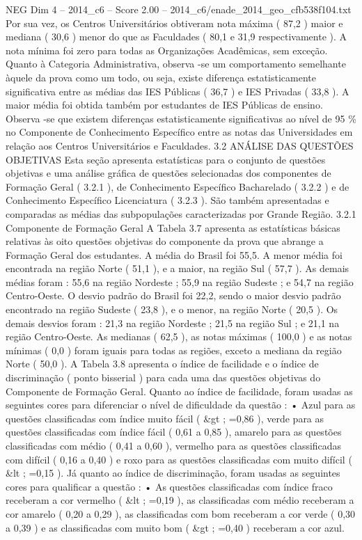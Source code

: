 \begin{textsample}{NEG Dim 4 – 2014\_c6 – Score 2.00 – 2014\_c6/enade\_2014\_geo\_cfb538f104.txt}
Por sua vez, os Centros Universitários obtiveram nota máxima ( 87,2 ) maior e mediana ( 30,6 ) menor do que as Faculdades ( 80,1 e 31,9 respectivamente ).
A nota mínima foi zero para todas as Organizações Acadêmicas, sem exceção.
Quanto à Categoria Administrativa, observa -se um comportamento semelhante àquele da prova como um todo, ou seja, existe diferença estatisticamente significativa entre as médias das IES Públicas ( 36,7 ) e IES Privadas ( 33,8 ).
A maior média foi obtida também por estudantes de IES Públicas de ensino.
Observa -se que existem diferenças estatisticamente significativas ao nível de 95 \% no Componente de Conhecimento Específico entre as notas das Universidades em relação aos Centros Universitários e Faculdades. 3.2 ANÁLISE DAS QUESTÕES OBJETIVAS Esta seção apresenta estatísticas para o conjunto de questões objetivas e uma análise gráfica de questões selecionadas dos componentes de Formação Geral ( 3.2.1 ), de Conhecimento Específico Bacharelado ( 3.2.2 ) e de Conhecimento Específico Licenciatura ( 3.2.3 ).
São também apresentadas e comparadas as médias das subpopulações caracterizadas por Grande Região. 3.2.1 Componente de Formação Geral A Tabela 3.7 apresenta as estatísticas básicas relativas às oito questões objetivas do componente da prova que abrange a Formação Geral dos estudantes.
A média do Brasil foi 55,5.
A menor média foi encontrada na região Norte ( 51,1 ), e a maior, na região Sul ( 57,7 ).
As demais médias foram : 55,6 na região Nordeste ; 55,9 na região Sudeste ; e 54,7 na região Centro-Oeste.
O desvio padrão do Brasil foi 22,2, sendo o maior desvio padrão encontrado na região Sudeste ( 23,8 ), e o menor, na região Norte ( 20,5 ).
Os demais desvios foram : 21,3 na região Nordeste ; 21,5 na região Sul ; e 21,1 na região Centro-Oeste.
As medianas ( 62,5 ), as notas máximas ( 100,0 ) e as notas mínimas ( 0,0 ) foram iguais para todas as regiões, exceto a mediana da região Norte ( 50,0 ).
A Tabela 3.8 apresenta o índice de facilidade e o índice de discriminação ( ponto bisserial ) para cada uma das questões objetivas do Componente de Formação Geral.
Quanto ao índice de facilidade, foram usadas as seguintes cores para diferenciar o nível de dificuldade da questão : • Azul para as questões classificadas com índice muito fácil ( \&gt ; =0,86 ), verde para as questões classificadas com índice fácil ( 0,61 a 0,85 ), amarelo para as questões classificadas com médio ( 0,41 a 0,60 ), vermelho para as questões classificadas com difícil ( 0,16 a 0,40 ) e roxo para as questões classificadas com muito difícil ( \&lt ; =0,15 ).
Já quanto ao índice de discriminação, foram usadas as seguintes cores para qualificar a questão : • As questões classificadas com índice fraco receberam a cor vermelho ( \&lt ; =0,19 ), as classificadas com médio receberam a cor amarelo ( 0,20 a 0,29 ), as classificadas com bom receberam a cor verde ( 0,30 a 0,39 ) e as classificadas com muito bom ( \&gt ; =0,40 ) receberam a cor azul.

\end{textsample}
